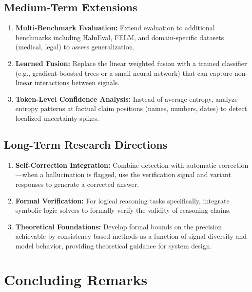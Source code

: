 \subsection{Medium-Term Extensions}

\begin{enumerate}
    \item \textbf{Multi-Benchmark Evaluation:} Extend evaluation to additional benchmarks including HaluEval, FELM, and domain-specific datasets (medical, legal) to assess generalization.

    \item \textbf{Learned Fusion:} Replace the linear weighted fusion with a trained classifier (e.g., gradient-boosted trees or a small neural network) that can capture non-linear interactions between signals.

    \item \textbf{Token-Level Confidence Analysis:} Instead of average entropy, analyze entropy patterns at factual claim positions (names, numbers, dates) to detect localized uncertainty spikes.
\end{enumerate}

\subsection{Long-Term Research Directions}

\begin{enumerate}
    \item \textbf{Self-Correction Integration:} Combine detection with automatic correction---when a hallucination is flagged, use the verification signal and variant responses to generate a corrected answer.

    \item \textbf{Formal Verification:} For logical reasoning tasks specifically, integrate symbolic logic solvers to formally verify the validity of reasoning chains.

    \item \textbf{Theoretical Foundations:} Develop formal bounds on the precision achievable by consistency-based methods as a function of signal diversity and model behavior, providing theoretical guidance for system design.
\end{enumerate}

\section{Concluding Remarks}

